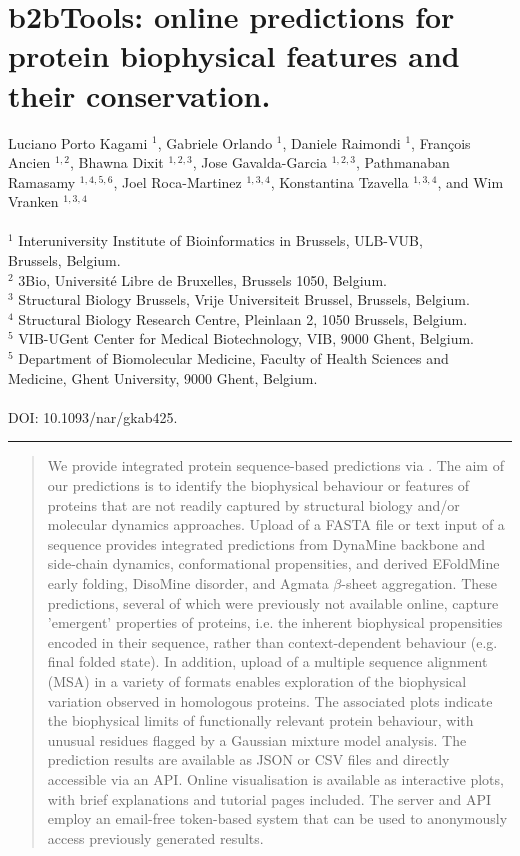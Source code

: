 \chapter{b2bTools: online predictions for protein biophysical features and their conservation.}\label{chapter:b2b_online}

Luciano Porto Kagami $^{1}$, Gabriele Orlando $^{1}$, Daniele Raimondi $^{1}$, François Ancien $^{1,2}$, Bhawna Dixit $^{1,2,3}$, Jose Gavalda-Garcia $^{1,2,3}$, Pathmanaban Ramasamy $^{1,4,5,6}$, Joel Roca-Martinez $^{1,3,4}$, Konstantina Tzavella $^{1,3,4}$, and Wim Vranken $^{1,3,4}$
\\
\\
$^{1}$ Interuniversity Institute of Bioinformatics in Brussels, ULB-VUB, \\Brussels, Belgium.
\\
$^{2}$ 3Bio, Université Libre de Bruxelles, Brussels 1050, Belgium.
\\
$^{3}$ Structural Biology Brussels, Vrije Universiteit Brussel, Brussels, Belgium.
\\
$^{4}$ Structural Biology Research Centre, Pleinlaan 2, 1050 Brussels, Belgium.
\\
$^{5}$ VIB-UGent Center for Medical Biotechnology, VIB, 9000 Ghent, Belgium.
\\
$^{5}$ Department of Biomolecular Medicine, Faculty of Health Sciences and Medicine, Ghent University, 9000 Ghent, Belgium.
\\
\\
DOI: 10.1093/nar/gkab425.

\vspace{1em}
\hrule
\vspace{1em}

\begin{abstract}
    We provide integrated protein sequence-based predictions via . The aim of our predictions is to identify the biophysical behaviour or features of proteins that are not readily captured by structural biology and/or molecular dynamics approaches. Upload of a FASTA file or text input of a sequence provides integrated predictions from DynaMine backbone and side-chain dynamics, conformational propensities, and derived EFoldMine early folding, DisoMine disorder, and Agmata $\beta$-sheet aggregation. These predictions, several of which were previously not available online, capture 'emergent' properties of proteins, i.e. the inherent biophysical propensities encoded in their sequence, rather than context-dependent behaviour (e.g. final folded state). In addition, upload of a multiple sequence alignment (MSA) in a variety of formats enables exploration of the biophysical variation observed in homologous proteins. The associated plots indicate the biophysical limits of functionally relevant protein behaviour, with unusual residues flagged by a Gaussian mixture model analysis. The prediction results are available as JSON or CSV files and directly accessible via an API. Online visualisation is available as interactive plots, with brief explanations and tutorial pages included. The server and API employ an email-free token-based system that can be used to anonymously access previously generated results.
\end{abstract}